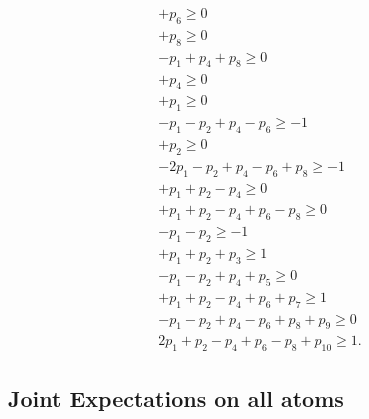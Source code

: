 \documentclass[%
 showpacs,
 showkeys,
 preprintnumbers,
 amsmath,amssymb,
 aps,
  pra,
  longbibliography,
 floatfix,
 ]{revtex4-1}
\begin{document}
\begin{eqnarray}
                                    + p_6                                    \ge           0       \\
                                                  + p_8                      \ge           0       \\
  - p_1               + p_4                       + p_8                      \ge           0       \\
                      + p_4                                                  \ge           0       \\
  + p_1                                                                      \ge           0       \\
  - p_1 - p_2         + p_4         - p_6                                    \ge           -1      \\
        + p_2                                                                \ge           0       \\
  -2p_1 - p_2         + p_4         - p_6         + p_8                      \ge           -1      \\
  + p_1 + p_2         - p_4                                                  \ge           0       \\
  + p_1 + p_2         - p_4         + p_6         - p_8                      \ge           0       \\
  - p_1 - p_2                                                                \ge           -1      \\
  + p_1 + p_2  + p_3                                                         \ge           1       \\
  - p_1 - p_2         + p_4  + p_5                                           \ge           0       \\
  + p_1 + p_2         - p_4         + p_6  + p_7                             \ge           1       \\
  - p_1 - p_2         + p_4         - p_6         + p_8  + p_9               \ge           0       \\
   2p_1 + p_2         - p_4         + p_6         - p_8         + p_{10}     \ge           1
.
\label{2017-b-kl-p-c}
\end{eqnarray}


\subsection{Joint Expectations on all atoms}
\end{document}
